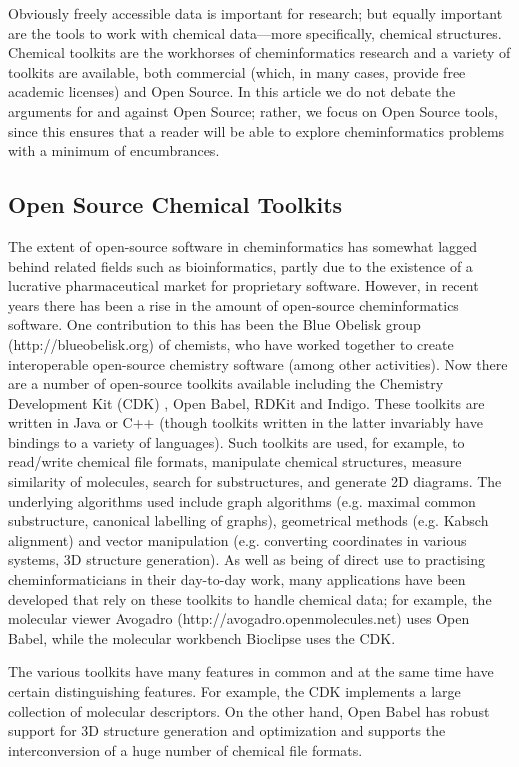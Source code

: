 \documentclass{sig-alternate}
\begin{document}
Obviously freely accessible data is important for research; but
equally important are the tools to work with chemical data---more
specifically, chemical structures. Chemical toolkits are the workhorses
of cheminformatics research and a variety of toolkits are available,
both commercial (which, in many cases, provide free academic
licenses) and Open Source. In this article we do not debate the
arguments for and against Open Source; rather, we focus on Open Source
tools, since this ensures that a reader will be able to explore
cheminformatics problems with a minimum of encumbrances.

\subsection{Open Source Chemical Toolkits}
\label{sec:toolkits}

The extent of open-source software in cheminformatics has somewhat
lagged behind related fields such as bioinformatics, partly
due to the existence of a lucrative pharmaceutical market for
proprietary software. However, in recent years there has been a
rise in the amount of open-source cheminformatics software. One
contribution to this has been the Blue Obelisk group
(http://blueobelisk.org) of chemists, who have worked together to
create interoperable open-source chemistry software (among other
activities). Now there are a number of open-source toolkits available
including the Chemistry Development
Kit (CDK) \cite{steinbeck2003}, Open Babel, RDKit and Indigo. These toolkits are written in
Java or C++ (though toolkits written in the latter invariably have
bindings to a variety of languages). Such toolkits are used, for
example, to read/write chemical file formats, manipulate chemical
structures, measure similarity of molecules, search for substructures,
and generate 2D diagrams. The underlying algorithms used include graph
algorithms (e.g. maximal common substructure, canonical labelling of
graphs), geometrical methods (e.g. Kabsch alignment) and vector
manipulation (e.g. converting coordinates in various systems, 3D
structure generation). As well as being of direct use to practising
cheminformaticians in their day-to-day work, many applications have
been developed that rely on these toolkits to handle chemical data;
for example, the molecular viewer Avogadro
(http://avogadro.openmolecules.net) uses Open Babel, while the
molecular workbench Bioclipse \cite{Bioclipse2} uses the CDK.

The various toolkits have many features in common and at the same time
have certain distinguishing features. For example, the CDK implements
a large collection of molecular descriptors. On the other hand,
Open Babel has robust support for 3D structure generation and
optimization and supports the interconversion of a huge number of
chemical file formats.
\end{document}
